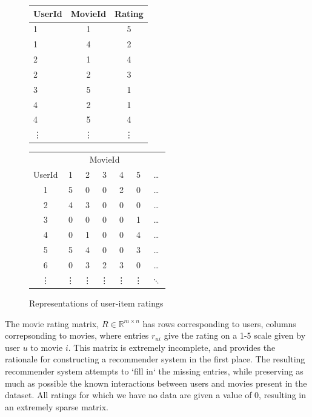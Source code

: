 \documentclass{article} %
\begin{document}
\begin{figure}[H]
  \caption{Representations of user-item ratings}
  \centering



\begin{center}
\begin{tabular}{l c c} 
\toprule 
UserId & MovieId & Rating \\ 
\midrule %
1 & 1 & 5 \\ 
1 & 4 & 2 \\ 
2 & 1 & 4 \\ 
2 & 2 & 3 \\ 
3 & 5 & 1 \\ 
4 & 2 & 1 \\ 
4 & 5 & 4 \\
\vdots  & \vdots & \vdots \\ 
\bottomrule %
\end{tabular}
\quad \quad \quad
\begin{tabular}{c c c c c c c} 
\toprule 
& \multicolumn{5}{c}{MovieId} \\ 
UserId & 1 & 2 & 3 & 4 & 5 & \dots \\ 
\midrule 
1 & 5 & 0 & 0 & 2 & 0 & \dots\\ 
2 & 4 & 3 & 0 & 0 & 0 & \dots\\ 
3 & 0 & 0 & 0 & 0 & 1 & \dots\\ 
4 & 0 & 1 & 0 & 0 & 4 & \dots\\ 
5 & 5 & 4 & 0 & 0 & 3 & \dots\\ 
6 & 0 & 3 & 2 & 3 & 0 & \dots\\ 
\vdots & \vdots & \vdots  & \vdots  & \vdots & \vdots & $\ddots$ \\ 
\bottomrule 
\end{tabular}
\end{center}
\end{figure}

The movie rating matrix, $R \in \mathbb{R}^{m \times n}$ has rows corresponding to users, columns correpsonding to movies, where entries $r_{ui}$ give the rating on a 1-5 scale given by user $u$ to movie $i$. This matrix is extremely incomplete, and provides the rationale for constructing a recommender system in the first place. The resulting recommender system attempts to `fill in` the missing entries, while preserving as much as possible the known interactions between users and movies present in the dataset. All ratings for which we have no data are given a value of 0, resulting in an extremely sparse matrix. 
\end{document}
